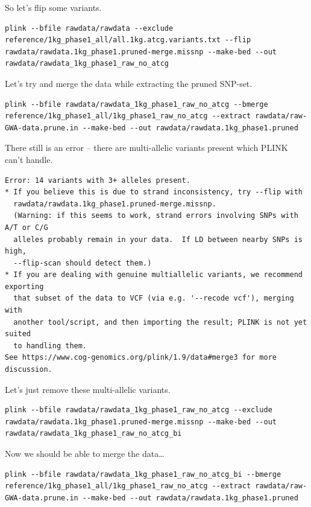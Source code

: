 \documentclass[
]{book}
\begin{document}
So let's flip some variants.

\begin{verbatim}
plink --bfile rawdata/rawdata --exclude reference/1kg_phase1_all/all.1kg.atcg.variants.txt --flip rawdata/rawdata.1kg_phase1.pruned-merge.missnp --make-bed --out rawdata/rawdata_1kg_phase1_raw_no_atcg
\end{verbatim}

Let's try and merge the data while extracting the pruned SNP-set.

\begin{verbatim}
plink --bfile rawdata/rawdata_1kg_phase1_raw_no_atcg --bmerge reference/1kg_phase1_all/1kg_phase1_raw_no_atcg --extract rawdata/raw-GWA-data.prune.in --make-bed --out rawdata/rawdata.1kg_phase1.pruned
\end{verbatim}

There still is an error -- there are multi-allelic variants present which PLINK can't handle.

\begin{verbatim}
Error: 14 variants with 3+ alleles present.
* If you believe this is due to strand inconsistency, try --flip with
  rawdata/rawdata.1kg_phase1.pruned-merge.missnp.
  (Warning: if this seems to work, strand errors involving SNPs with A/T or C/G
  alleles probably remain in your data.  If LD between nearby SNPs is high,
  --flip-scan should detect them.)
* If you are dealing with genuine multiallelic variants, we recommend exporting
  that subset of the data to VCF (via e.g. '--recode vcf'), merging with
  another tool/script, and then importing the result; PLINK is not yet suited
  to handling them.
See https://www.cog-genomics.org/plink/1.9/data#merge3 for more discussion.
\end{verbatim}

Let's just remove these multi-allelic variants.

\begin{verbatim}
plink --bfile rawdata/rawdata_1kg_phase1_raw_no_atcg --exclude rawdata/rawdata.1kg_phase1.pruned-merge.missnp --make-bed --out rawdata/rawdata_1kg_phase1_raw_no_atcg_bi
\end{verbatim}

Now we should be able to merge the data\ldots{}

\begin{verbatim}
plink --bfile rawdata/rawdata_1kg_phase1_raw_no_atcg_bi --bmerge reference/1kg_phase1_all/1kg_phase1_raw_no_atcg --extract rawdata/raw-GWA-data.prune.in --make-bed --out rawdata/rawdata.1kg_phase1.pruned
\end{verbatim}
\end{document}
